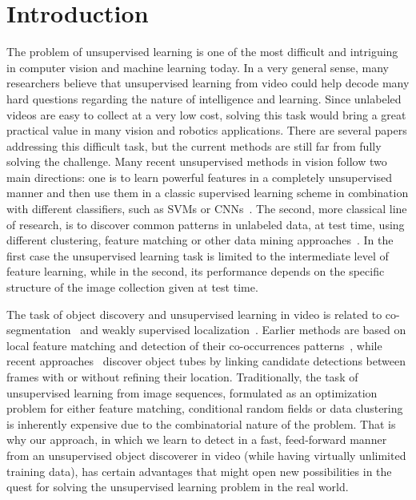 \documentclass[10pt,twocolumn,letterpaper]{article}
\begin{document}
\section{Introduction}
  
   The problem of unsupervised learning is one of the most difficult and intriguing in computer vision and machine learning today. In a very general sense, many researchers believe that unsupervised learning from video could help decode many hard questions regarding the nature of intelligence and learning. Since unlabeled videos are easy to collect at a very low cost, solving this task would bring a great practical value in many vision and robotics applications. There are several papers addressing this difficult task, but the current methods are still far from fully solving the challenge. Many recent unsupervised methods in vision follow two main directions: one is to learn powerful features in a completely unsupervised manner and then use them in a classic supervised learning scheme in combination with different classifiers, such as SVMs or CNNs~\cite{radenovic2016cnn, misra2016shuffle, li2016unsupervised}. The second, more classical line of research, is to discover common patterns in unlabeled data, at test time, using different clustering, feature matching or other data mining approaches~\cite{jain1999data,cho2015unsupervised,key:sivic_05}. In the first case the unsupervised learning task is limited to the intermediate level of feature learning, while in the second, its performance depends on the specific structure of the image collection given at test time. 
   
   The task of object discovery and unsupervised learning in video is related to co-segmentation~\cite{joulin2010discriminative,kim2011distributed,rubinstein2013unsupervised,joulin2012multi,kuettel2012segmentation,vicente2011object,rubio2013video} and weakly supervised localization~\cite{deselaers2012weakly,nguyen2009weakly,siva2013looking}. Earlier methods are based on local feature matching and detection of their co-occurrences patterns~\cite{stretcu2015multiple,key:sivic_05,key:leordeanu_cvpr05,key:parikh_07_2,liu2007topic}, while recent approaches~\cite{joulin2014efficient,rochan2014efficient} discover object tubes by linking candidate detections between frames with or without refining their location. Traditionally, the task of unsupervised learning from image sequences, formulated as an optimization problem for either feature matching, conditional random fields or data clustering is inherently expensive due to the combinatorial nature of the problem. That is why our approach, in which we learn to detect in a fast, feed-forward manner from an unsupervised object discoverer in video (while having virtually unlimited training data), has certain advantages that might open new possibilities in the quest for solving the unsupervised learning problem in the real world. 
   
\end{document}

